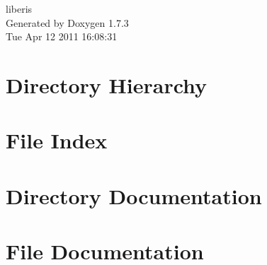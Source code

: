 \documentclass[a4paper]{book}
\begin{document}
\hypersetup{pageanchor=false}
\begin{titlepage}
\vspace*{7cm}
\begin{center}
{\Large liberis }\\
\vspace*{1cm}
{\large Generated by Doxygen 1.7.3}\\
\vspace*{0.5cm}
{\small Tue Apr 12 2011 16:08:31}\\
\end{center}
\end{titlepage}
\clearemptydoublepage
{}
\tableofcontents
\clearemptydoublepage
{}
\hypersetup{pageanchor=true}
\chapter{Directory Hierarchy}

\chapter{File Index}

\chapter{Directory Documentation}



\chapter{File Documentation}












\printindex
\end{document}
